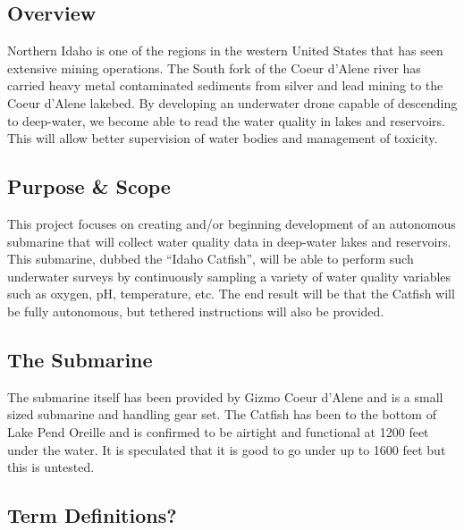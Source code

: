 \documentclass[
10pt, %
a4paper, %
oneside, %
headinclude,footinclude, %
BCOR5mm, %
]{scrartcl}
\begin{document}
\subsection*{Overview}

Northern Idaho is one of the regions in the western United States that has seen extensive mining operations. The South fork of the Coeur d’Alene river has carried heavy metal contaminated sediments from silver and lead mining to the Coeur d’Alene lakebed. By developing an underwater drone capable of descending to deep-water, we become able to read the water quality in lakes and reservoirs. This will allow better supervision of water bodies and management of toxicity.

\subsection*{Purpose \& Scope}

This project focuses on creating and/or beginning development of an autonomous submarine that will collect water quality data in deep-water lakes and reservoirs. This submarine, dubbed the “Idaho Catfish”, will be able to perform such underwater surveys by continuously sampling a variety of water quality variables such as oxygen, pH, temperature, etc. The end result will be that the Catfish will be fully autonomous, but tethered instructions will also be provided.

\subsection*{The Submarine}
The submarine itself has been provided by Gizmo Coeur d'Alene and is a small sized submarine and handling gear set. The Catfish has been to the bottom of Lake Pend Oreille and is confirmed to be airtight and functional at 1200 feet under the water. It is speculated that it is good to go under up to 1600 feet but this is untested.

\subsection*{Term Definitions?}
\end{document}

